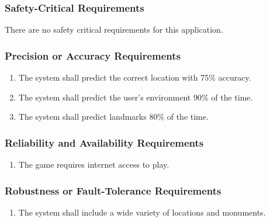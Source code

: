 \documentclass[titlepage]{article}
\newcounter{req}
\begin{document}
		\subsubsection{Safety-Critical Requirements}
		\label{ssub:safety_critical_requirements}
		There are no safety critical requirements for this application.
		
		\subsubsection{Precision or Accuracy Requirements}
		\label{ssub:precision_or_accuracy_requirements}
		\begin{enumerate}[{PR}1.]
		\setcounter{enumi}{\value{req}}
			\item
			The system shall predict the correct location with 75\% accuracy.
			\item
			The system shall predict the user's environment 90\% of the time.
			\item
			The system shall predict landmarks 80\% of the time.
		\setcounter{req}{\theenumi}
		\end{enumerate}
		
		\subsubsection{Reliability and Availability Requirements}
		\label{ssub:reliability_and_availability_requirements}
		\begin{enumerate}[{PR}1. ]
		\setcounter{enumi}{\value{req}}
			\item
			The game requires internet access to play.
		\setcounter{req}{\theenumi}
		\end{enumerate}
		
		\subsubsection{Robustness or Fault-Tolerance Requirements}
		\label{ssub:robustness_or_fault_tolerance_requirements}
		\begin{enumerate}[{PR}1. ]
		\setcounter{enumi}{\value{req}}
			\item 
			The system shall include a wide variety of locations and monuments.
		\setcounter{req}{\theenumi}
		\end{enumerate}
		
\end{document}
